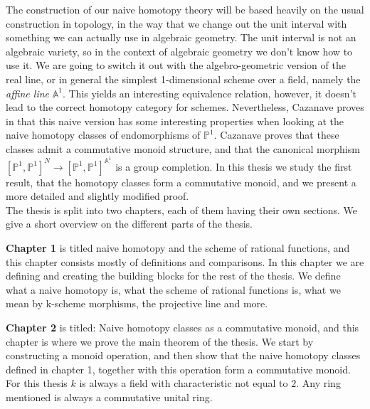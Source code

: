 The construction of our naive homotopy theory will be based heavily on the usual construction in topology, in the way that we change out the unit interval with something we can actually use in algebraic geometry. 
The unit interval is not an algebraic variety, so in the context of algebraic geometry we don't know how to use it. We are going to switch it out with the algebro-geometric version of the real line, or in general the simplest 1-dimensional scheme over a field, namely the \emph{affine line} \(\mathbb{A}^1\). This yields an interesting equivalence relation, however, it doesn't lead to the correct homotopy category for schemes. Nevertheless, Cazanave proves in \cite{Cazanave} that this naive version has some interesting properties when looking at the naive homotopy classes of endomorphisms of \(\mathbb{P}^1\). Cazanave proves that these classes admit a commutative monoid structure, and that the canonical morphism \([\mathbb{P}^1, \mathbb{P}^1]^N \to [\mathbb{P}^1, \mathbb{P}^1]^{\mathbb{A}^1} \) is a group completion. In this thesis we study the first result, that the homotopy classes form a commutative monoid, and we present a more detailed and slightly modified proof. 
\bigskip \\

The thesis is split into two chapters, each of them having their own sections. We give a short overview on the different parts of the thesis.

\textbf{Chapter 1} is titled naive homotopy and the scheme of rational functions, and this chapter consists mostly of definitions and comparisons. In this chapter we are defining and creating the building blocks for the rest of the thesis. We define what a naive homotopy is, what the scheme of rational functions is, what we mean by k-scheme morphisms, the projective line and more. 

\textbf{Chapter 2} is titled: Naive homotopy classes as a commutative monoid, and this chapter is where we prove the main theorem of the thesis. We start by constructing a monoid operation, and then show that the naive homotopy classes defined in chapter 1, together with this operation form a commutative monoid. 
\bigskip \\

For this thesis \(k\) is always a field with characteristic not equal to \(2\). Any ring mentioned is always a commutative unital ring. 
 



